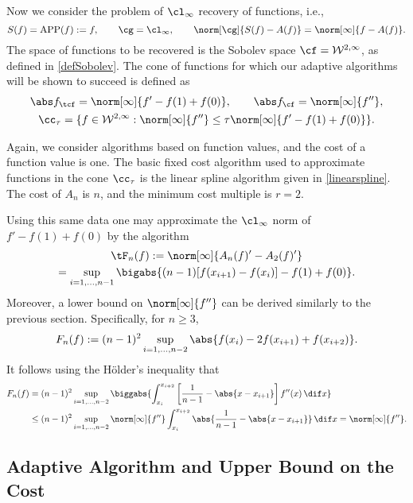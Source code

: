 Now we consider the problem of $\cl_{\infty}$ recovery of functions, i.e.,
\[
S(f)=\APP(f):=f, \qquad \cg=\cl_{\infty}, \qquad \norm[\cg]{S(f)-A(f)}=\norm[\infty]{f-A(f)}.
\]
The space of functions to be recovered is the Sobolev space $\cf = \mathcal{W}^{2,\infty}$, as defined in \eqref{defSobolev}.  The cone of functions for which our adaptive algorithms will be shown to succeed is defined as
\begin{subequations} \label{coneappxdef}
\begin{gather}
\Ftnorm{f}=\norm[\infty]{f'-f(1)+f(0)}, \qquad \Fnorm{f}=\norm[\infty]{f''}, \\
\cc_{\tau}=\{f \in  \mathcal{W}^{2,\infty} : \norm[\infty]{f''}\leq \tau\norm[\infty]{f'-f(1)+f(0)}\}.
\end{gather}
\end{subequations}

Again, we consider algorithms based on function values, and the cost of a function value is one.   The basic fixed cost algorithm used to approximate functions in the cone $\cc_{\tau}$ is the linear spline algorithm given in \eqref{linearspline}.
The cost of $A_n$ is $n$, and the minimum cost multiple is $r=2$.

Using this same data one may approximate the $\cl_\infty$ norm of $f'-f(1)+f(0)$ by the algorithm
\begin{multline}\label{estfirstderiv}
\tF_n(f) := \norm[\infty]{A_n(f)' - A_2(f)'} \\
= \sup_{i=1, \ldots, n-1} \bigabs{(n-1) [f(x_{i+1})-f(x_i)]-f(1)+f(0)}.
\end{multline}
Moreover, a lower bound on $\norm[\infty]{f''}$ can be derived similarly to the previous section.  Specifically, for $n \ge 3$,
\begin{equation} \label{Fnormappxalg}
F_n(f) := (n-1)^2\sup_{i=1, \ldots, n-2} \abs{f(x_i) - 2 f(x_{i+1})+f(x_{i+2})}.
\end{equation}
It follows using the H\"older's inequality that
\begin{align*}
F_n(f) &= (n-1)^2\sup_{i=1, \ldots, n-2} \biggabs{\int_{x_i}^{x_{i+2}} \left[\frac{1}{n-1} - \abs{x-x_{i+1}}\right] f''(x) \, \dif x} \\
&\le (n-1)^2\sup_{i=1, \ldots, n-2} \norm[\infty]{f''} \int_{x_i}^{x_{i+2}} \abs{\frac{1}{n-1} - \abs{x-x_{i+1}}} \, \dif x = \norm[\infty]{f''}.
\end{align*}

\subsection{Adaptive Algorithm and Upper Bound on the Cost}

